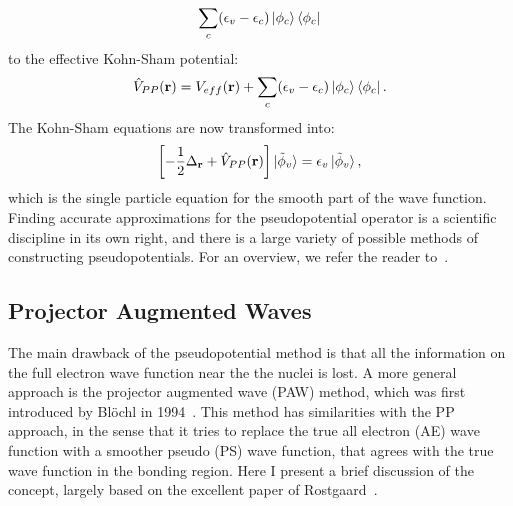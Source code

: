 \begin{refsection}
\begin{equation*}
\sum_c (\epsilon_v - \epsilon_c) \ket{\phi_c} \bra{\phi_c} 
\end{equation*} 
to the effective Kohn-Sham potential: 
\begin{equation} 
\hat{V}_{PP}(\mathbf{r}) = V_{eff}(\mathbf{r}) + \sum_c (\epsilon_v - 
\epsilon_c) \ket{\phi_c} \bra{\phi_c}. 
\end{equation} 
The Kohn-Sham equations are now transformed into: 
\begin{equation} 
\left[- \frac{1}{2} \Delta_{\mathbf{r}} + \hat{V}_{PP}(\mathbf{r}) 
\right]\ket{\tilde{\phi}_v} = \epsilon_v \ket{\tilde{\phi}_v}, 
\end{equation} 
which is the single particle equation for the smooth part of the wave 
function. Finding accurate approximations for the pseudopotential operator is 
a scientific discipline in its own right, and there is a large variety of 
possible methods of constructing pseudopotentials. For an overview, we refer 
the reader to~\cite{Singh2006}. 
 
\subsection{Projector Augmented Waves} \label{dft:sec-PAW} 
 
The main drawback of the pseudopotential method is that all the information on 
the full electron wave function near the the nuclei is 
lost. A more general approach is the projector augmented 
wave (PAW) method, which was first introduced by Bl\"ochl in 
1994~\cite{Blochl1994}. This method has similarities with the PP approach, in 
the sense that it tries to replace the true all electron (AE) wave function 
with a smoother pseudo (PS) wave function, that agrees with the true wave 
function in the bonding region. Here I present a brief discussion of the concept,
largely based on the excellent paper of Rostgaard~\cite{Rostgaard2009}.
 

\end{refsection}
